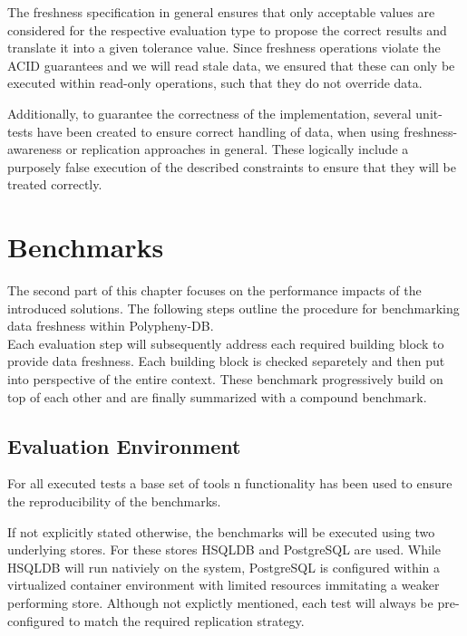 The freshness specification in general ensures that only acceptable values are considered for the respective evaluation type to propose the correct results and translate it into
a given tolerance value.
Since freshness operations violate the ACID guarantees and we will read stale data, we ensured that these can only be executed within read-only operations, 
such that they do not override data.


Additionally, to guarantee the correctness of the implementation, several unit-tests have 
been created to ensure correct handling of data, when using freshness-awareness or replication approaches in general.
These logically include a purposely false execution of the described constraints to ensure that they will be treated correctly.




\section{Benchmarks}

The second part of this chapter focuses on the performance impacts of the introduced solutions.
The following steps outline the procedure for benchmarking data freshness within Polypheny-DB.\\
Each evaluation step will subsequently address each required building block to provide data freshness.
Each building block is checked separetely and then put into perspective of the entire context.
These benchmark progressively build on top of each other and are finally summarized with a compound benchmark.\\




\subsection{Evaluation Environment}
\label{sec:env}

For all executed tests a base set of tools n functionality has been used to ensure the reproducibility of the benchmarks.

If not explicitly stated otherwise, the benchmarks will be executed using two underlying stores.
For these stores HSQLDB and PostgreSQL are used. While HSQLDB will run nativiely on the system, PostgreSQL is configured within a virtualized
container environment with limited resources immitating a weaker performing store.
Although not explictly mentioned, each test will always be pre-configured to match the required replication strategy.


